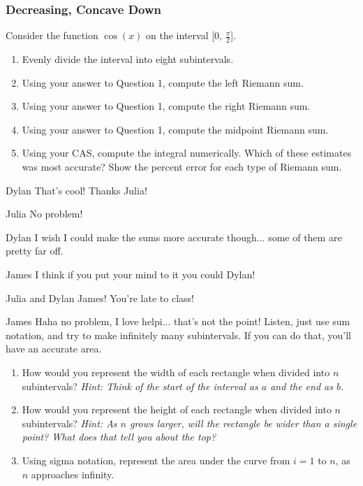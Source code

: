 \documentclass{ximera}
\begin{document}
\subsubsection{Decreasing, Concave Down}
Consider the function $\cos(x)$ on the interval [0, $\frac{\pi}{2}$].
\begin{enumerate}
\item{Evenly divide the interval into eight subintervals.}
\item{Using your answer to Question 1, compute the left Riemann sum.}
\item{Using your answer to Question 1, compute the right Riemann sum.}
\item{Using your answer to Question 1, compute the midpoint Riemann sum.}
\item{Using your CAS, compute the integral numerically. Which of these estimates was most accurate? Show the percent error for each type of Riemann sum.}
\end{enumerate}

\begin{dialogue}
\item[Dylan] That's cool! Thanks Julia!
\item[Julia] No problem!
\item[Dylan] I wish I could make the sums more accurate though... some of them are pretty far off.
\item[James] I think if you put your mind to it you could Dylan!
\item[Julia and Dylan] James! You're late to class!
\item[James] Haha no problem, I love helpi... that's not the point! Listen, just use sum notation, and try to make infinitely many subintervals. If you can do that, you'll have an accurate area.
\end{dialogue}
\begin{enumerate}
\item{How would you represent the width of each rectangle when divided into $n$ subintervals? \textit{Hint: Think of the start of the interval as $a$ and the end as $b$.}}
\item{How would you represent the height of each rectangle when divided into $n$ subintervals? \textit{Hint: As $n$ grows larger, will the rectangle be wider than a single point? What does that tell you about the top?}}
\item{Using sigma notation, represent the area under the curve from $i = 1$ to $n$, as $n$ approaches infinity.}
\end{enumerate}
\end{document}
